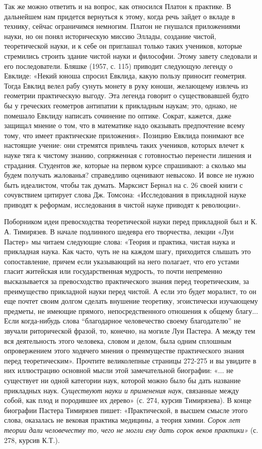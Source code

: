 Так же можно ответить и на вопрос, как относился Платон к
практике. В дальнейшем нам придется вернуться к этому, когда речь
зайдет о вкладе в технику, сейчас ограничимся немногим. Платон не
гнушался приложениями науки, но он понял историческую миссию Эллады,
создание чистой, теоретической науки, и к себе он приглашал только
таких учеников, которые стремились строить здание чистой науки и
философии. Этому завету следовали и его последователи. Бляшке (1957,
с. 115) приводит следующую легенду о Евклиде: «Некий юноша спросил
Евклида, какую пользу приносит геометрия. Тогда Евклид велел рабу
сунуть монету в руку юноши, желающему извлечь из геометрии
практическую выгоду. Эта легенда говорит о существовавшей будто бы у
греческих геометров антипатии к прикладным наукам; это, однако, не
помешало Евклиду написать сочинение по оптике. Сократ, кажется, даже
защищал мнение о том, что в математике надо оказывать предпочтение
всему тому, что имеет практические приложения». Позицию Евклида
понимают все настоящие учение: они стремятся привлечь таких учеников,
которых влечет к науке тяга к чистому знанию, сопряженная с
готовностью перенести лишения и страдания. Студентов же, которые на
первом курсе спрашивают: а сколько мы будем получать жалованья?
справедливо оценивают невысоко. И вовсе не нужно быть идеалистом,
чтобы так думать. Марксист Бернал на с. 26 своей книги с сочувствием
цитирует слова Дж. Томсона: «Исследования в прикладной науке приводят
к реформам, исследования в чистой науке приводят к революции».

Поборником идеи превосходства теоретической науки перед прикладной был
и К. А. Тимирязев. В начале подлинного шедевра его творчества, лекции
«Луи Пастер» мы читаем следующие слова: «Теория и практика, чистая
наука и прикладная наука. Как часто, чуть не на каждом шагу,
приходится слышать это сопоставление, причем если указывающий на него
полагает, что его устами гласит житейская или государственная
мудрость, то почти непременно высказывается за превосходство
практического знания перед теоретическим, за преимущество прикладной
науки перед чистой. А если это будет моралист, то он еще почтет своим
долгом сделать внушение теоретику, эгоистически изучающему предметы,
не имеющие прямого, непосредственного отношения к общему благу... Если
когда-нибудь слова ``благодарное человечество своему благодателю'' не
звучали риторической фразой, то, конечно, на могиле Луи Пастера. А
между тем вся деятельность этого человека, словом и делом, была одним
сплошным опровержением этого ходячего мнения о преимуществе
практического знания перед теоретическим». Прочтите великолепные
страницы 272-275 и вы увидите в них иллюстрацию основной мысли этой
замечательной биографии: «... не существует ни одной категории наук,
которой можно было бы дать название прикладных наук. \emph{Существуют
науки и применения наук}, связанные между собой, как плод и породившее
их дерево» (с. 274, курсив Тимирязева). В конце биографии Пастера
Тимирязев пишет: «Практической, в высшем смысле этого слова, оказалась
не вековая практика медицины, а теория химии. \emph{Сорок лет теории
дали человечеству то, чего не могли ему дать сорок веков практики»}
(с. 278, курсив К.Т.).

